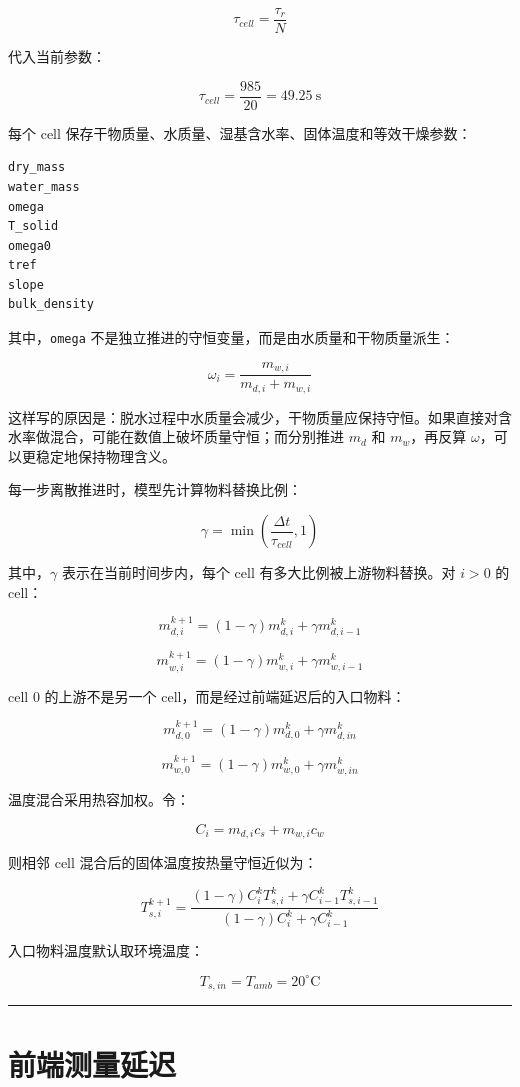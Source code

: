 \documentclass[UTF8,openany,zihao=-4,oneside]{ctexbook}
\providecommand{\passthrough}[1]{#1}
\newcommand{\manualdivider}{\par\vspace{0.6em}\noindent\textcolor{FGLine}{\rule{\linewidth}{0.7pt}}\vspace{0.6em}\par}
\begin{document}
\[
\tau_{cell}=\frac{\tau_r}{N}
\]

代入当前参数：

\[
\tau_{cell}=\frac{985}{20}=49.25\ \mathrm{s}
\]

每个 cell 保存干物质量、水质量、湿基含水率、固体温度和等效干燥参数：

\begin{lstlisting}
dry_mass
water_mass
omega
T_solid
omega0
tref
slope
bulk_density
\end{lstlisting}

其中，\passthrough{\lstinline!omega!} 不是独立推进的守恒变量，而是由水质量和干物质量派生：

\[
\omega_i=\frac{m_{w,i}}{m_{d,i}+m_{w,i}}
\]

这样写的原因是：脱水过程中水质量会减少，干物质量应保持守恒。如果直接对含水率做混合，可能在数值上破坏质量守恒；而分别推进 \(m_d\) 和 \(m_w\)，再反算 \(\omega\)，可以更稳定地保持物理含义。

每一步离散推进时，模型先计算物料替换比例：

\[
\gamma=\min\left(\frac{\Delta t}{\tau_{cell}},1\right)
\]

其中，\(\gamma\) 表示在当前时间步内，每个 cell 有多大比例被上游物料替换。对 \(i>0\) 的 cell：

\[
m_{d,i}^{k+1}=(1-\gamma)m_{d,i}^{k}+\gamma m_{d,i-1}^{k}
\]

\[
m_{w,i}^{k+1}=(1-\gamma)m_{w,i}^{k}+\gamma m_{w,i-1}^{k}
\]

cell 0 的上游不是另一个 cell，而是经过前端延迟后的入口物料：

\[
m_{d,0}^{k+1}=(1-\gamma)m_{d,0}^{k}+\gamma m_{d,in}^{k}
\]

\[
m_{w,0}^{k+1}=(1-\gamma)m_{w,0}^{k}+\gamma m_{w,in}^{k}
\]

温度混合采用热容加权。令：

\[
C_i=m_{d,i}c_s+m_{w,i}c_w
\]

则相邻 cell 混合后的固体温度按热量守恒近似为：

\[
T_{s,i}^{k+1}
=
\frac{(1-\gamma)C_i^kT_{s,i}^k+\gamma C_{i-1}^kT_{s,i-1}^k}
{(1-\gamma)C_i^k+\gamma C_{i-1}^k}
\]

入口物料温度默认取环境温度：

\[
T_{s,in}=T_{amb}=20^\circ\mathrm{C}
\]

\manualdivider

\section{前端测量延迟}\label{ux524dux7aefux6d4bux91cfux5ef6ux8fdf}
\end{document}
